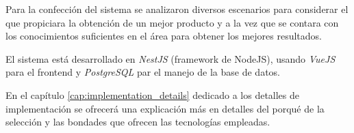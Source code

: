 Para la confección del sistema se analizaron diversos escenarios para considerar el que propiciara la obtención de un mejor producto y a la vez que se contara con los conocimientos suficientes en el área para obtener los mejores resultados. 

El sistema está desarrollado en \textit{NestJS} (framework de NodeJS), usando \textit{VueJS} para el frontend y \textit{PostgreSQL} par el manejo de la base de datos.

En el capítulo \ref{cap:implementation_details} dedicado a los detalles de implementación se ofrecerá una explicación más en detalles del porqué de la selección y las bondades que ofrecen las tecnologías empleadas.

%
%
%
%
%
